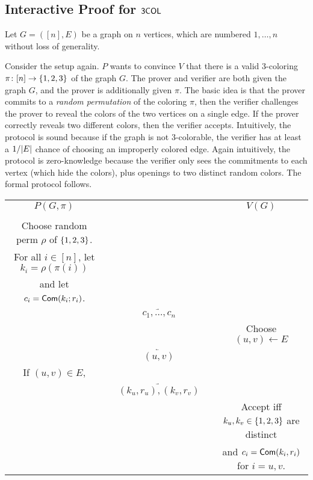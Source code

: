\documentclass[11pt]{article}
\begin{document}
\subsection{Interactive Proof for $\mathsf{3COL}$}
\label{sec:ip-3col}

Let $G = ([n],E)$ be a graph on $n$ vertices, which are numbered $1,
\ldots, n$ without loss of generality.

Consider the setup again. $P$ wants to convince $V$ that there is a
valid $3$-coloring $\pi \colon [n] \to \{1,2,3\}$ of the graph $G$.
The prover and verifier are both given the graph $G$, and the prover
is additionally given $\pi$.  The basic idea is that the prover
commits to a \emph{random permutation} of the coloring $\pi$, then the
verifier challenges the prover to reveal the colors of the two
vertices on a single edge.  If the prover correctly reveals two
different colors, then the verifier accepts.  Intuitively, the
protocol is sound because if the graph is not $3$-colorable, the
verifier has at least a $1/\lvert E\rvert$ chance of choosing an improperly
colored edge.  Again intuitively, the protocol is zero-knowledge
because the verifier only sees the commitments to each vertex (which
hide the colors), plus openings to two distinct random colors.  The
formal protocol follows.

\begin{center}
 \begin{tabular}{ccc}
   $P(G, \pi)$ & & $V(G)$ \\ \\
   Choose random perm $\rho$ of $\{1,2,3\}$. & & \\
   For all $i \in [n]$, let $k_{i} = \rho(\pi(i))$ & & \\
   and let $c_{i} = \mathsf{Com}(k_{i}; r_{i})$. & & \\
   & $\underrightarrow{\quad c_{1}, \ldots, c_{n} \quad }$ & \\
   && Choose $(u,v) \gets E$ \\
   & $\underleftarrow{\quad (u,v) \quad}$ & \\
   If $(u,v) \in E$, && \\
   & $\underrightarrow{\quad (k_{u}, r_{u}), (k_{v}, r_{v})
     \quad}$ & \\
   && Accept iff $k_{u}, k_{v} \in \{1,2,3\}$ are distinct \\
   && and $c_{i} = \mathsf{Com}(k_{i}, r_{i})$ for $i=u,v$.
 \end{tabular}
\end{center}
\end{document}
